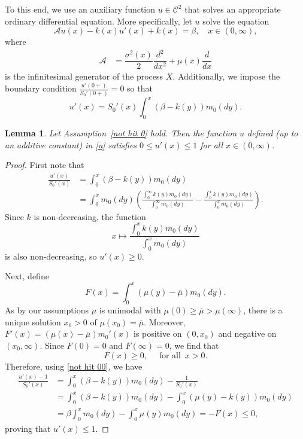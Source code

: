 \documentclass[12pt]{article}
\newtheorem{lemma}[theorem]{Lemma}
\begin{document}
To this end, we use an auxiliary function $u \in \mathcal{C}^2$ that solves an appropriate ordinary differential equation. More specifically, let $u$ solve the equation
\begin{equation}\label{HJB-always}
\mathcal{A}u(x) - k(x)u'(x) + k(x) = \beta, \quad x \in (0,\infty),
\end{equation}
where 
\begin{align*} 
    \mathcal{A} &= \dfrac{\sigma^2(x)}{2} \dfrac{d^2}{dx^2} + \mu(x)\dfrac{d}{dx} %
\end{align*}
is the infinitesimal generator of the process $X$.
Additionally, we impose the boundary condition $\frac{u'(0+)}{S_0'(0+)}=0$ so that
\begin{equation}\label{u}
u'(x) = S_0'(x)\int_0^x (\beta-k(y))m_0(dy).
\end{equation}

\begin{lemma}\label{Lip}
Let Assumption~\ref{not hit 0} hold.
Then the function $u$ defined (up to an additive constant) in \eqref{u} satisfies
    $0\leq u'(x) \leq 1$ for all $x \in(0,\infty)$.
\end{lemma}

\begin{proof}
    First note that  
    \begin{align*}
    \frac{u'(x)}{S_0'(x)} &= \int_0^x (\beta-k(y))m_0(dy) \\
    & = \int_0^xm_0(dy)\left(\frac{\int_0^{\infty}k(y)m_0(dy)}{\int_0^\infty m_0(dy)} - \frac{\int_0^x k(y) m_0(dy)}{\int_0^x m_0(dy)} \right).
    \end{align*}
    Since $k$ is non-decreasing, the function 
    \[x\mapsto \frac{\int_0^x k(y) m_0(dy)}{\int_0^x m_0(dy)}\]
    is also non-decreasing, so
    $u'(x) \geq 0$.

    Next, define
    \begin{equation*}
        F(x) = \int_0^x (\mu(y)-\overline{\mu}) m_0(dy).
    \end{equation*} 
    As by our assumptions $\mu$ is unimodal with $\mu(0) \geq \overline{\mu} > \mu(\infty)$, there is a unique solution $x_0>0$ of  $\mu(x_0) = \overline{\mu}$. Moreover, $F'(x) =  (\mu(x)-\overline{\mu})m_0'(x)$ is positive on $(0,x_0)$ and negative on $(x_0, \infty)$. Since $F(0) = 0$ and $F(\infty) = 0$, we find that
    \begin{equation*}
        F(x) \geq 0, \quad \text{ for all } \, x >0.
    \end{equation*}
    Therefore, using \eqref{not hit 00}, we have
    \begin{align*}
    \frac{u'(x)-1}{S_0'(x)} &= \int_0^x (\beta-k(y))m_0(dy) - \frac{1}{S_0'(x)} \\
    & = \int^x_0 (\beta-k(y))m_0(dy) - \int_0^x(\mu(y)-k(y)) m_0(dy)\\
    & = \beta \int_0^x m_0(dy)-\int_0^x \mu(y) m_0(dy)  
     = -F(x) \leq 0,
    \end{align*}
    proving that $u'(x)\leq 1$.
\end{proof}
\end{document}
